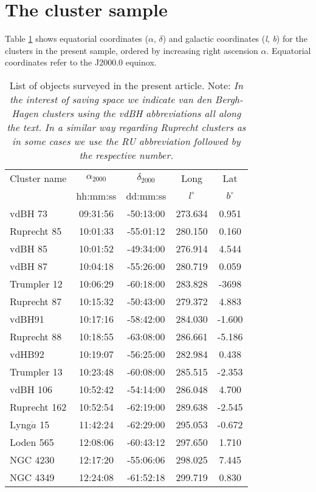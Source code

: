 \documentclass{aa}
\begin{document}
\section{The cluster sample}
\label{sec:clust_sample}

Table \ref{tab:clust_list} shows equatorial coordinates ($\alpha$, $\delta$) and
galactic coordinates (\textit{l}, \textit{b}) for the clusters in the present
sample, ordered by increasing right ascension $\alpha$. Equatorial coordinates
refer to the J2000.0 equinox.

\begin{table}[ht]
    \centering
    \begin{tabular}{lcccc}
    \hline 
        Cluster name & $\alpha_{2000}$ & $\delta_{2000}$ & Long & Lat\\
         & hh:mm:ss & dd:mm:ss & $l^\circ$ & $b^\circ$\\
       \hline \hline 
        vdBH 73 & 09:31:56 & -50:13:00 & 273.634 & 0.951\\
        Ruprecht 85 & 10:01:33 & -55:01:12 &280.150 & 0.160\\
        vdBH 85 & 10:01:52 & -49:34:00 & 276.914 & 4.544\\
        vdBH 87 & 10:04:18 & -55:26:00 & 280.719 & 0.059\\
        Trumpler 12 & 10:06:29 & -60:18:00 & 283.828 & -3698\\
        Ruprecht 87 & 10:15:32 & -50:43:00 & 279.372 & 4.883\\
        vdBH91 & 10:17:16 & -58:42:00 & 284.030 & -1.600\\
        Ruprecht 88 & 10:18:55 & -63:08:00 & 286.661 & -5.186\\
        vdHB92 & 10:19:07 & -56:25:00 & 282.984 & 0.438\\
        Trumpler 13 & 10:23:48 & -60:08:00 & 285.515 & -2.353\\
        vdBH 106 & 10:52:42 & -54:14:00 & 286.048 & 4.700\\
        Ruprecht 162 & 10:52:54 & -62:19:00 & 289.638 & -2.545\\
        Lyng$\dot{a}$ 15 & 11:42:24 & -62:29:00 & 295.053 & -0.672\\
        Loden 565 & 12:08:06 & -60:43:12 & 297.650 & 1.710\\
        NGC 4230 & 12:17:20 & -55:06:06 & 298.025 & 7.445\\
        NGC 4349 & 12:24:08 & -61:52:18 & 299.719 & 0.830\\
        \hline
    \end{tabular}
    \caption{List of objects surveyed in the present article.
    Note: \textit{In the interest of saving space we indicate van den
    Bergh-Hagen clusters using the vdBH abbreviations all
    along the text. In a similar way regarding Ruprecht clusters as in some
    cases we use the RU abbreviation followed by the respective number.}}
    \label{tab:clust_list}
\end{table}
\end{document}
